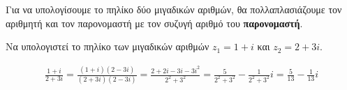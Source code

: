 
\begin{rem}
  Για να υπολογίσουμε το πηλίκο δύο μιγαδικών αριθμών, θα πολλαπλασιάζουμε τον αριθμητή
  και τον παρονομαστή με τον συζυγή αριθμό του \textbf{παρονομαστή}.
\end{rem}
\begin{mybox3}
  \begin{example} 
    Να υπολογιστεί το πηλίκο των μιγαδικών αριθμών $ z_{1}=1+i $ και $ z_{2}=2+3i $.
  \end{example}
\end{mybox3}
\begin{solution}
  \begin{align*}
    \frac{1+i}{2+3i} = \frac{(1+i)(2-3i)}{(2+3i)(2-3i)} =
    \frac{2+2i-3i-3i^{2}}{2^{2}+3^{2}} = \frac{5}{2^{2}+3^{2}} - \frac{1}{2^{2}+3^{2}}i =
    \frac{5}{13} - \frac{1}{13} i
  \end{align*}
\end{solution}

